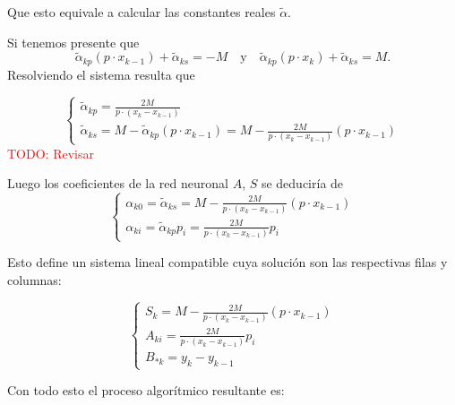 Que esto equivale a calcular las constantes reales $\tilde {\alpha}$. 

Si tenemos presente que 
\begin{equation}
    \tilde{\alpha}_{k p} (p \cdot x_{k-1}) + \tilde{\alpha}_{k s} = -M 
    \quad \text{y} \quad 
    \tilde{\alpha}_{k p}(p \cdot x_k) + \tilde{\alpha}_{k s}= M.
\end{equation} 
Resolviendo el sistema resulta que 

\begin{equation}
    \left\{ 
        \begin{array}{l}
            \tilde{\alpha}_{k p} = \frac{2 M}{p \cdot (x_k - x_{k-1})}
            \\
            \tilde{\alpha}_{k s} 
            = M -  \tilde{\alpha}_{k p}(p \cdot x_{k-1})
            = M -  \frac{2 M}{p \cdot (x_k - x_{k-1})}(p \cdot x_{k-1}) 
        \end{array}
    \right.
\end{equation}
\textcolor{red}{ TODO: Revisar}

Luego los coeficientes de la red neuronal $A$, $S$ se deduciría de 
\begin{equation}
    \left\{ 
        \begin{array}{l}
            \alpha_{k 0} = \tilde{\alpha}_{k s} =
            M -  \frac{2 M}{p \cdot (x_k - x_{k-1})}(p \cdot x_{k-1}) 
            \\
            \alpha_{k i} =  \tilde{\alpha}_{k p} p_{i}
            = 
            \frac{2 M}{p \cdot (x_k - x_{k-1})}
            p_i 
        \end{array}
        \right.
\end{equation}

Esto define un sistema lineal compatible
cuya solución son las respectivas filas y columnas: 

\begin{equation}
    \left\{ 
        \begin{array}{l}
            S_{k} = M -  \frac{2 M}{p \cdot (x_k - x_{k-1})}(p \cdot x_{k-1})\\
            A_{k i} = \frac{2 M}{p \cdot (x_k - x_{k-1})}
            p_{i}  
            \\
            B_{* k} = y_k - y_{k-1}
        \end{array}
    \right.
\end{equation}  

Con todo esto el proceso algorítmico resultante es: 

